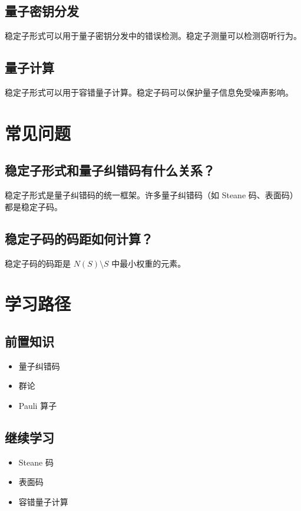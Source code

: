 \documentclass[12pt,a4paper]{article}
\begin{document}
\subsection{量子密钥分发}

稳定子形式可以用于量子密钥分发中的错误检测。稳定子测量可以检测窃听行为。

\subsection{量子计算}

稳定子形式可以用于容错量子计算。稳定子码可以保护量子信息免受噪声影响。

\section{常见问题}

\subsection{稳定子形式和量子纠错码有什么关系？}

稳定子形式是量子纠错码的统一框架。许多量子纠错码（如 Steane 码、表面码）都是稳定子码。

\subsection{稳定子码的码距如何计算？}

稳定子码的码距是 $N(S) \setminus S$ 中最小权重的元素。

\section{学习路径}

\subsection{前置知识}
\begin{itemize}
  \item 量子纠错码
  \item 群论
  \item Pauli 算子
\end{itemize}

\subsection{继续学习}
\begin{itemize}
  \item Steane 码
  \item 表面码
  \item 容错量子计算
\end{itemize}
\end{document}
